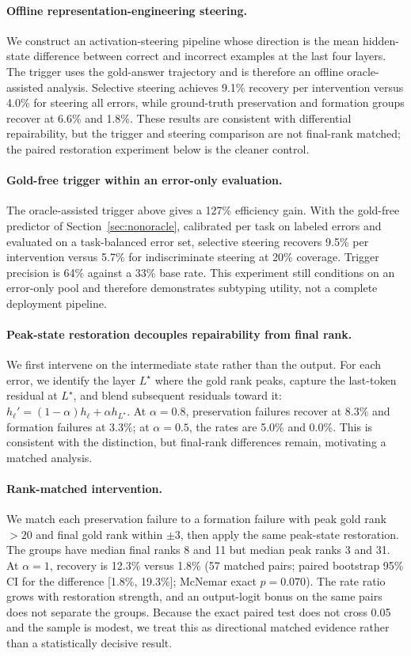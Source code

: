 \documentclass{article} %
\begin{document}
\paragraph{Offline representation-engineering steering.}
We construct an activation-steering pipeline whose direction is the mean hidden-state difference between correct and incorrect examples at the last four layers. The trigger uses the gold-answer trajectory and is therefore an offline oracle-assisted analysis. Selective steering achieves 9.1\% recovery per intervention versus 4.0\% for steering all errors, while ground-truth preservation and formation groups recover at 6.6\% and 1.8\%. These results are consistent with differential repairability, but the trigger and steering comparison are not final-rank matched; the paired restoration experiment below is the cleaner control.

\paragraph{Gold-free trigger within an error-only evaluation.}
The oracle-assisted trigger above gives a 127\% efficiency gain. With the gold-free predictor of Section~\ref{sec:nonoracle}, calibrated per task on labeled errors and evaluated on a task-balanced error set, selective steering recovers 9.5\% per intervention versus 5.7\% for indiscriminate steering at 20\% coverage. Trigger precision is 64\% against a 33\% base rate. This experiment still conditions on an error-only pool and therefore demonstrates subtyping utility, not a complete deployment pipeline.

\paragraph{Peak-state restoration decouples repairability from final rank.}
We first intervene on the intermediate state rather than the output. For each error, we identify the layer $L^\star$ where the gold rank peaks, capture the last-token residual at $L^\star$, and blend subsequent residuals toward it: $h_\ell'=(1-\alpha)h_\ell+\alpha h_{L^\star}$. At $\alpha=0.8$, preservation failures recover at 8.3\% and formation failures at 3.3\%; at $\alpha=0.5$, the rates are 5.0\% and 0.0\%. This is consistent with the distinction, but final-rank differences remain, motivating a matched analysis.

\paragraph{Rank-matched intervention.}
We match each preservation failure to a formation failure with peak gold rank $>20$ and final gold rank within $\pm3$, then apply the same peak-state restoration. The groups have median final ranks 8 and 11 but median peak ranks 3 and 31. At $\alpha=1$, recovery is 12.3\% versus 1.8\% (57 matched pairs; paired bootstrap 95\% CI for the difference [1.8\%, 19.3\%]; McNemar exact $p=0.070$). The rate ratio grows with restoration strength, and an output-logit bonus on the same pairs does not separate the groups. Because the exact paired test does not cross 0.05 and the sample is modest, we treat this as directional matched evidence rather than a statistically decisive result.
\end{document}
